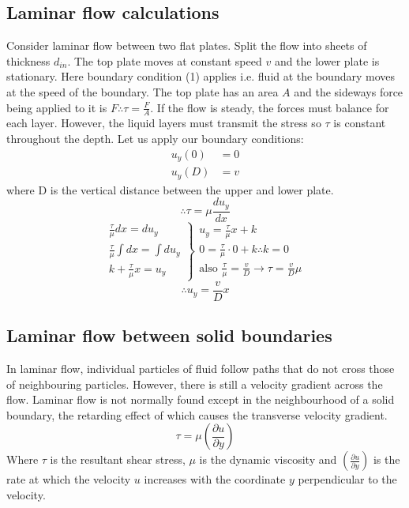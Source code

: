 \documentclass[class=report, crop=false, 12pt,a4paper]{standalone}
\begin{document}
\subsection{Laminar flow calculations}
Consider laminar flow between two flat plates. Split the flow into sheets of thickness \(d_{in}\). The top plate moves at constant speed \(v\) and the lower plate is stationary. Here boundary condition (1) applies i.e. fluid at the boundary moves at the speed of the boundary. The top plate has an area \(A\) and the sideways force being applied to it is \(F \therefore \tau = \frac{F}{A} \). If the flow is steady, the forces must balance for each layer. However, the liquid layers must transmit the stress so \(\tau\) is constant throughout the depth. Let us apply our boundary conditions:
\begin{align*}
  u_y(0) &= 0 \\ 
  u_y(D) &= v
\end{align*}
where D is the vertical distance between the upper and lower plate.
\[ \therefore \tau = \mu \frac{du_y}{dx} \]
\[
  \left.
    \begin{array}{r}
      \frac{\tau}{\mu} dx = du_y \\
      \frac{\tau}{\mu}\int dx = \int du_y \\
      k + \frac{\tau}{\mu}x = u_y
    \end{array}
  \right\}
  \begin{array}{l}
    u_y = \frac{\tau}{\mu}x + k \\
    0 = \frac{\tau}{\mu}\cdot 0 +k \therefore k = 0 \\
    \textrm{also } \frac{\tau}{\mu} = \frac{v}{D} \rightarrow \tau = \frac{v}{D}\mu
  \end{array}
\]
\[ \therefore u_y = \frac{v}{D}x \]
\subsection{Laminar flow between solid boundaries}
In laminar flow, individual particles of fluid follow paths that do not cross those of neighbouring particles. However, there is still a velocity gradient across the flow. Laminar flow is not normally found except in the neighbourhood of a solid boundary, the retarding effect of which causes the transverse velocity gradient. 
\[ \tau = \mu \left( \frac{\partial u}{\partial y} \right) \]
Where \(\tau\) is the resultant shear stress, \(\mu\) is the dynamic viscosity and \(\left( \frac{\partial u}{\partial y} \right)\) is the rate at which the velocity \(u\) increases with the coordinate \(y\) perpendicular to the velocity.
\end{document}
